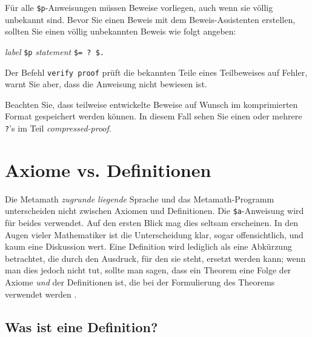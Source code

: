 Für alle \texttt{\$p}-Anweisungen müssen Beweise vorliegen, auch wenn sie völlig unbekannt sind.  Bevor Sie einen Beweis mit dem Beweis-Assistenten erstellen, sollten Sie einen völlig unbekannten Beweis wie folgt angeben: 
\begin{center}
  {\em label} \texttt{\$p} {\em statement} \texttt{\$= ?\ \$.}
\end{center}
\index{\texttt{]}@\texttt{?}\ innerhalb von Beweisen}

Der Befehl \texttt{verify proof} prüft die bekannten Teile eines Teilbeweises auf Fehler, warnt Sie aber, dass die Anweisung nicht bewiesen ist. 

Beachten Sie, dass teilweise entwickelte Beweise auf Wunsch im komprimierten Format gespeichert werden können.  In diesem Fall sehen Sie einen oder mehrere \texttt{?}'s im Teil {\em compressed-proof}.

\section{Axiome vs. Definitionen}\label{definitions}

Die Metamath \textit{zugrunde liegende} Sprache und das Metamath-Programm unterscheiden nicht zwischen Axiomen und Definitionen. Die \texttt{\$a}-Anweisung wird für beides verwendet.  Auf den ersten Blick mag dies seltsam erscheinen.  In den Augen vieler Mathematiker ist die Unterscheidung klar, sogar offensichtlich, und kaum eine Diskussion wert.  Eine Definition wird lediglich als eine Abkürzung betrachtet, die durch den Ausdruck, für den sie steht, ersetzt werden kann; wenn man dies jedoch nicht tut, sollte man sagen, dass ein Theorem eine Folge der Axiome {\em und} der Definitionen ist, die bei der Formulierung des Theorems verwendet werden \cite[S.~20]{Behnke}.

\subsection{Was ist eine Definition?}

